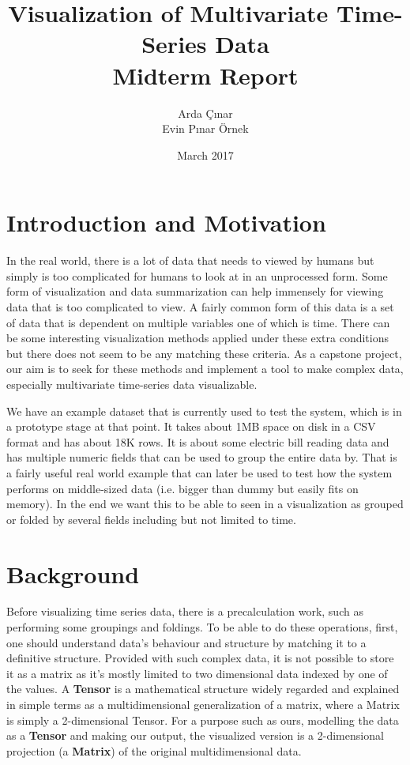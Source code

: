 \documentclass[11pt]{article}
\title{Visualization of Multivariate Time-Series Data \\ Midterm Report}
\author{Arda Çınar \\ Evin Pınar Örnek}
\date{March 2017}
\begin{document}
\maketitle


\section{Introduction and Motivation}

In the real world, there is a lot of data that needs to viewed by humans but simply is too complicated for humans to look at in an unprocessed form. Some form of visualization and data summarization can help immensely for viewing data that is too complicated to view. A fairly common form of this data is a set of data that is dependent on multiple variables one of which is time. There can be some interesting visualization methods applied under these extra conditions but there does not seem to be any matching these criteria. As a capstone project, our aim is to seek for these methods and implement a tool to make complex data, especially multivariate time-series data visualizable. 

We have an example dataset that is currently used to test the system, which is in a prototype stage at that point. It takes about 1MB space on disk in a CSV format and has about 18K rows. It is about some electric bill reading data and has multiple numeric fields that can be used to group the entire data by. That is a fairly useful real world example that can later be used to test how the system performs on middle-sized data (i.e. bigger than dummy but easily fits on memory). In the end we want this to be able to seen in a visualization as grouped or folded by several fields including but not limited to time. 

\section{Background}


Before visualizing time series data, there is a precalculation work, such as performing some groupings and foldings. To be able to do these operations, first, one should understand data's behaviour and structure by matching it to a definitive structure. Provided with such complex data, it is not possible to store it as a matrix as it's mostly limited to two dimensional data indexed by one of the values. A \textbf{Tensor} is a mathematical structure widely regarded and explained in simple terms as a multidimensional generalization of a matrix\cite{kolda}, where a Matrix is simply a 2-dimensional Tensor. For a purpose such as ours, modelling the data as a \textbf{Tensor} and making our output, the visualized version is a 2-dimensional projection (a \textbf{Matrix}) of the original multidimensional data. 
\end{document}
